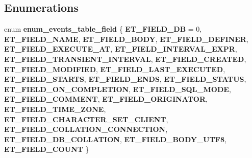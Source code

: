 \subsection*{Enumerations}
\begin{DoxyCompactItemize}
\item 
\mbox{\label{group__Event__Scheduler_ga0c86e1e2e740030ff97685e49de3063c}} 
enum {\bfseries enum\+\_\+events\+\_\+table\+\_\+field} \{ \newline
{\bfseries E\+T\+\_\+\+F\+I\+E\+L\+D\+\_\+\+DB} = 0, 
{\bfseries E\+T\+\_\+\+F\+I\+E\+L\+D\+\_\+\+N\+A\+ME}, 
{\bfseries E\+T\+\_\+\+F\+I\+E\+L\+D\+\_\+\+B\+O\+DY}, 
{\bfseries E\+T\+\_\+\+F\+I\+E\+L\+D\+\_\+\+D\+E\+F\+I\+N\+ER}, 
\newline
{\bfseries E\+T\+\_\+\+F\+I\+E\+L\+D\+\_\+\+E\+X\+E\+C\+U\+T\+E\+\_\+\+AT}, 
{\bfseries E\+T\+\_\+\+F\+I\+E\+L\+D\+\_\+\+I\+N\+T\+E\+R\+V\+A\+L\+\_\+\+E\+X\+PR}, 
{\bfseries E\+T\+\_\+\+F\+I\+E\+L\+D\+\_\+\+T\+R\+A\+N\+S\+I\+E\+N\+T\+\_\+\+I\+N\+T\+E\+R\+V\+AL}, 
{\bfseries E\+T\+\_\+\+F\+I\+E\+L\+D\+\_\+\+C\+R\+E\+A\+T\+ED}, 
\newline
{\bfseries E\+T\+\_\+\+F\+I\+E\+L\+D\+\_\+\+M\+O\+D\+I\+F\+I\+ED}, 
{\bfseries E\+T\+\_\+\+F\+I\+E\+L\+D\+\_\+\+L\+A\+S\+T\+\_\+\+E\+X\+E\+C\+U\+T\+ED}, 
{\bfseries E\+T\+\_\+\+F\+I\+E\+L\+D\+\_\+\+S\+T\+A\+R\+TS}, 
{\bfseries E\+T\+\_\+\+F\+I\+E\+L\+D\+\_\+\+E\+N\+DS}, 
\newline
{\bfseries E\+T\+\_\+\+F\+I\+E\+L\+D\+\_\+\+S\+T\+A\+T\+US}, 
{\bfseries E\+T\+\_\+\+F\+I\+E\+L\+D\+\_\+\+O\+N\+\_\+\+C\+O\+M\+P\+L\+E\+T\+I\+ON}, 
{\bfseries E\+T\+\_\+\+F\+I\+E\+L\+D\+\_\+\+S\+Q\+L\+\_\+\+M\+O\+DE}, 
{\bfseries E\+T\+\_\+\+F\+I\+E\+L\+D\+\_\+\+C\+O\+M\+M\+E\+NT}, 
\newline
{\bfseries E\+T\+\_\+\+F\+I\+E\+L\+D\+\_\+\+O\+R\+I\+G\+I\+N\+A\+T\+OR}, 
{\bfseries E\+T\+\_\+\+F\+I\+E\+L\+D\+\_\+\+T\+I\+M\+E\+\_\+\+Z\+O\+NE}, 
{\bfseries E\+T\+\_\+\+F\+I\+E\+L\+D\+\_\+\+C\+H\+A\+R\+A\+C\+T\+E\+R\+\_\+\+S\+E\+T\+\_\+\+C\+L\+I\+E\+NT}, 
{\bfseries E\+T\+\_\+\+F\+I\+E\+L\+D\+\_\+\+C\+O\+L\+L\+A\+T\+I\+O\+N\+\_\+\+C\+O\+N\+N\+E\+C\+T\+I\+ON}, 
\newline
{\bfseries E\+T\+\_\+\+F\+I\+E\+L\+D\+\_\+\+D\+B\+\_\+\+C\+O\+L\+L\+A\+T\+I\+ON}, 
{\bfseries E\+T\+\_\+\+F\+I\+E\+L\+D\+\_\+\+B\+O\+D\+Y\+\_\+\+U\+T\+F8}, 
{\bfseries E\+T\+\_\+\+F\+I\+E\+L\+D\+\_\+\+C\+O\+U\+NT}
 \}
\end{DoxyCompactItemize}
